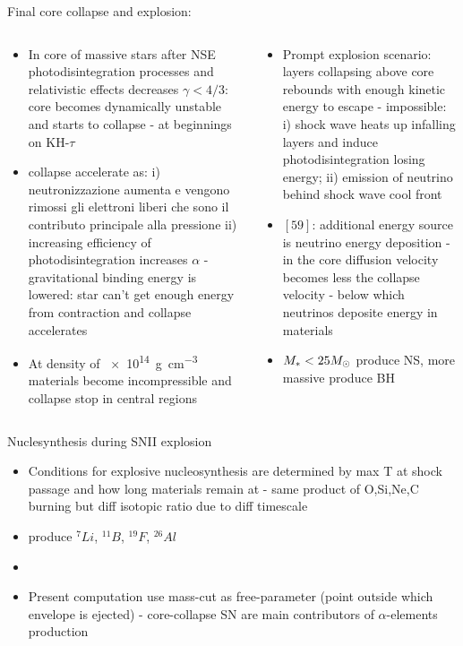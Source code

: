 \begin{frame}{Final core collapse and explosion: }
\begin{columns}[T]
\begin{column}{0.55\textwidth}
	\begin{itemize}
	\item In core of massive stars after NSE photodisintegration processes and relativistic effects decreases $\gamma<4/3$: core becomes dynamically unstable and starts to collapse - at beginnings on KH-$\tau$
	\item collapse accelerate as: i) neutronizzazione aumenta e vengono rimossi gli elettroni liberi che sono il contributo principale alla pressione ii) increasing efficiency of photodisintegration increases $\alpha$ - gravitational binding energy is lowered: star can't get enough energy from contraction and collapse accelerates
	\item At density of \SI{e14}{\gram\per\cubic\cm} materials become incompressible and collapse stop in central regions
	\end{itemize}
	\end{column}
	\begin{column}{0.45\textwidth}
	\begin{itemize}
	\item Prompt explosion scenario: layers collapsing above core rebounds with enough kinetic energy to escape - impossible: i) shock wave heats up infalling layers and induce photodisintegration losing energy; ii) emission of neutrino behind shock wave cool front 
	\item $[59]$: additional energy source is neutrino energy deposition - in the core \Pnue diffusion velocity becomes less the collapse velocity -  below which neutrinos deposite energy in materials
	\item $M_*<25M_{\odot}$ produce NS, more massive produce BH
	\end{itemize}
\end{column}\end{columns}
\end{frame}

\begin{frame}{Nuclesynthesis during SNII explosion}
\begin{itemize}
\item Conditions for explosive nucleosynthesis are determined by max T at shock passage and how long materials remain at - same product of O,Si,Ne,C burning but diff isotopic ratio due to diff timescale
\item {} produce $^7Li$, $^{11}B$, $^{19}F$, $^{26}Al$
\item {}
\item Present computation use mass-cut as free-parameter (point outside which envelope is ejected) - core-collapse SN are main contributors of $\alpha$-elements production
\end{itemize}
\end{frame}

